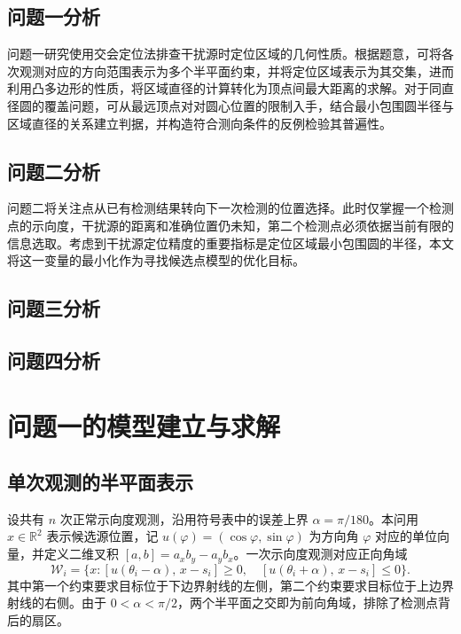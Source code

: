 \documentclass[UTF8,a4paper,zihao=-4,fontset=none]{ctexart}
\begin{document}
\subsection{问题一分析}

问题一研究使用交会定位法排查干扰源时定位区域的几何性质。根据题意，可将各次观测对应的方向范围表示为多个半平面约束，并将定位区域表示为其交集，进而利用凸多边形的性质，将区域直径的计算转化为顶点间最大距离的求解。对于同直径圆的覆盖问题，可从最远顶点对对圆心位置的限制入手，结合最小包围圆半径与区域直径的关系建立判据，并构造符合测向条件的反例检验其普遍性。

\subsection{问题二分析}

问题二将关注点从已有检测结果转向下一次检测的位置选择。此时仅掌握一个检测点的示向度，干扰源的距离和准确位置仍未知，第二个检测点必须依据当前有限的信息选取。考虑到干扰源定位精度的重要指标是定位区域最小包围圆的半径，本文将这一变量的最小化作为寻找候选点模型的优化目标。
\subsection{问题三分析}


\subsection{问题四分析}


\section{问题一的模型建立与求解}

\subsection{单次观测的半平面表示}

设共有 \(n\) 次正常示向度观测，沿用符号表中的误差上界 \(\alpha=\pi/180\)。本问用 \(x\in\mathbb R^2\) 表示候选源位置，记 \(u(\varphi)=(\cos\varphi,\sin\varphi)\) 为方向角 \(\varphi\) 对应的单位向量，并定义二维叉积 \([a,b]=a_xb_y-a_yb_x\)。一次示向度观测对应正向角域
\begin{equation}
  \mathcal W_i=\{x:[u(\theta_i-\alpha),\,x-s_i]\ge0,\quad [u(\theta_i+\alpha),\,x-s_i]\le0\}.
  \label{eq:wedge}
\end{equation}
其中第一个约束要求目标位于下边界射线的左侧，第二个约束要求目标位于上边界射线的右侧。由于 \(0<\alpha<\pi/2\)，两个半平面之交即为前向角域，排除了检测点背后的扇区。
\end{document}
